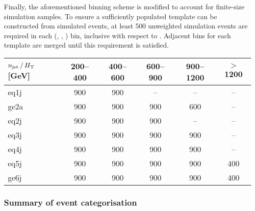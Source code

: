 Finally, the aforementioned \HTmiss binning scheme is modified to
account for finite-size simulation samples. To ensure a sufficiently
populated \HTmiss template can be constructed from simulated events,
at least 500 unweighted simulation events are required in each (\njet,
\scalht, \MHT) bin, inclusive with respect to \nb. Adjacent \HTmiss
bins for each template are merged until this requirement is satisfied.

\begin{table}[!h]
  \label{tab:mht-binning}
  \centering
  \begin{tabular}{ lccccc }
    \hline
    $n_{\text{jet}}\, / \,\mbox{$H_\text{T}$}$ [GeV] & 200--400 & 400--600 & 600--900 & 900--1200 & $>$1200 \\
    \hline
    eq1j                        & 900      & 900      & --       & --        & --      \\ 
    ge2a                        & 900      & 900      & 900      & 600       & --      \\ 
    eq2j                        & 900      & 900      & 900      & --        & --      \\ 
    eq3j                        & 900      & 900      & 900      & 900       & --      \\ 
    eq4j                        & 900      & 900      & 900      & 900       & --      \\ 
    eq5j                        & 900      & 900      & 900      & 900       & 400     \\ 
    ge6j                        & 900      & 900      & 900      & 900       & 400     \\ 
    \hline
  \end{tabular}
\end{table}

\subsubsection{Summary of event categorisation}
\label{sec:binning-summary}

